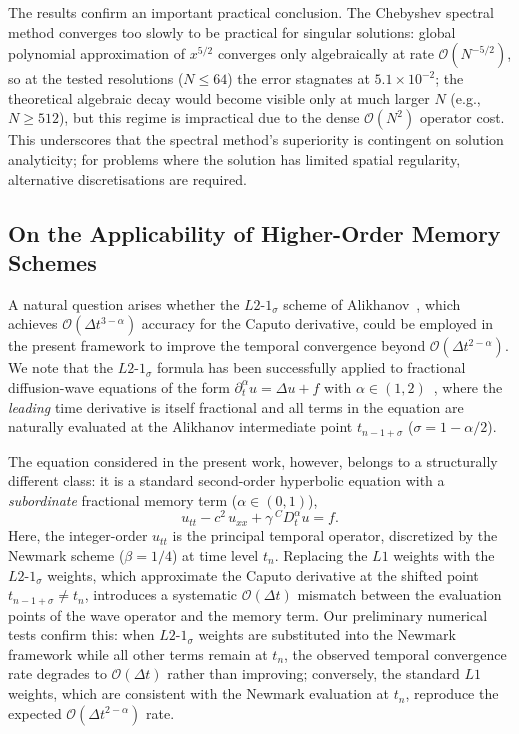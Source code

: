 \documentclass[a4paper,fleqn]{cas-sc}
\begin{document}
The results confirm an important practical conclusion. The Chebyshev spectral method converges too slowly to be practical for singular solutions: global polynomial approximation of $x^{5/2}$ converges only algebraically at rate $\mathcal{O}(N^{-5/2})$, so at the tested resolutions ($N \le 64$) the error stagnates at $5.1 \times 10^{-2}$; the theoretical algebraic decay would become visible only at much larger $N$ (e.g., $N \ge 512$), but this regime is impractical due to the dense $\mathcal{O}(N^2)$ operator cost. This underscores that the spectral method's superiority is contingent on solution analyticity; for problems where the solution has limited spatial regularity, alternative discretisations are required.

\subsection{On the Applicability of Higher-Order Memory Schemes}\label{sec:discussion_l2sigma}

A natural question arises whether the $L2$-$1_\sigma$ scheme of Alikhanov~\cite{ref21}, which achieves $\mathcal{O}(\Delta t^{3-\alpha})$ accuracy for the Caputo derivative, could be employed in the present framework to improve the temporal convergence beyond $\mathcal{O}(\Delta t^{2-\alpha})$. We note that the $L2$-$1_\sigma$ formula has been successfully applied to fractional diffusion-wave equations of the form $\partial_t^\alpha u = \Delta u + f$ with $\alpha \in (1,2)$~\cite{ref21,sun2006}, where the \emph{leading} time derivative is itself fractional and all terms in the equation are naturally evaluated at the Alikhanov intermediate point $t_{n-1+\sigma}$ ($\sigma = 1-\alpha/2$).

The equation considered in the present work, however, belongs to a structurally different class: it is a standard second-order hyperbolic equation with a \emph{subordinate} fractional memory term ($\alpha \in (0,1)$),
\[
  u_{tt} - c^2\,u_{xx} + \gamma\,{}^C\!D_t^\alpha u = f.
\]
Here, the integer-order $u_{tt}$ is the principal temporal operator, discretized by the Newmark scheme ($\beta = 1/4$) at time level $t_n$. Replacing the $L1$ weights with the $L2$-$1_\sigma$ weights, which approximate the Caputo derivative at the shifted point $t_{n-1+\sigma} \neq t_n$, introduces a systematic $\mathcal{O}(\Delta t)$ mismatch between the evaluation points of the wave operator and the memory term. Our preliminary numerical tests confirm this: when $L2$-$1_\sigma$ weights are substituted into the Newmark framework while all other terms remain at $t_n$, the observed temporal convergence rate degrades to $\mathcal{O}(\Delta t)$ rather than improving; conversely, the standard $L1$ weights, which are consistent with the Newmark evaluation at $t_n$, reproduce the expected $\mathcal{O}(\Delta t^{2-\alpha})$ rate.
\end{document}
